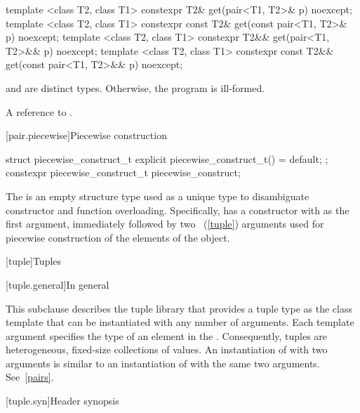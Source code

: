 %
\begin{itemdecl}
template <class T2, class T1>
  constexpr T2& get(pair<T1, T2>& p) noexcept;
template <class T2, class T1>
  constexpr const T2& get(const pair<T1, T2>& p) noexcept;
template <class T2, class T1>
  constexpr T2&& get(pair<T1, T2>&& p) noexcept;
template <class T2, class T1>
  constexpr const T2&& get(const pair<T1, T2>&& p) noexcept;
\end{itemdecl}
\begin{itemdescr}

\pnum
\requires {} and  are distinct types. Otherwise, the program is ill-formed.

\pnum
\returns A reference to .
\end{itemdescr}

[pair.piecewise]{Piecewise construction}

%
%
\begin{itemdecl}
struct piecewise_construct_t {
  explicit piecewise_construct_t() = default;
};
constexpr piecewise_construct_t piecewise_construct{};
\end{itemdecl}

\pnum
The   is an empty structure type
used as a unique type to disambiguate constructor and function overloading. Specifically,
 has a constructor with  as the
first argument, immediately followed by two ~(\ref{tuple}) arguments used
for piecewise construction of the elements of the  object.

[tuple]{Tuples}

[tuple.general]{In general}

\pnum
{}%
This subclause describes the tuple library that provides a tuple type as
the class template  that can be instantiated with any number
of arguments. Each template argument specifies
the type of an element in the .  Consequently, tuples are
heterogeneous, fixed-size collections of values. An instantiation of  with
two arguments is similar to an instantiation of  with the same two arguments.
See~\ref{pairs}.

[tuple.syn]{Header  synopsis}

